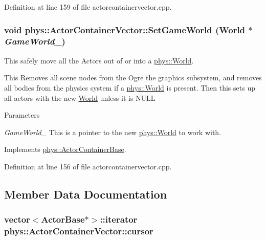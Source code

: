 Definition at line 159 of file actorcontainervector.cpp.

\hypertarget{classphys_1_1ActorContainerVector_ab4c1394254057465f7a2f89b87dc49aa}{
\subsubsection[{SetGameWorld}]{\setlength{\rightskip}{0pt plus 5cm}void phys::ActorContainerVector::SetGameWorld ({\bf World} $\ast$ {\em GameWorld\_\-})}}
\label{d3/d64/classphys_1_1ActorContainerVector_ab4c1394254057465f7a2f89b87dc49aa}


This safely move all the Actors out of or into a \hyperlink{classphys_1_1World}{phys::World}. 

This Removes all scene nodes from the Ogre the graphics subsystem, and removes all bodies from the physics system if a \hyperlink{classphys_1_1World}{phys::World} is present. Then this sets up all actors with the new \hyperlink{classphys_1_1World}{World} unless it is NULL 
\begin{DoxyParams}{Parameters}
\item[{\em GameWorld\_\-}]This is a pointer to the new \hyperlink{classphys_1_1World}{phys::World} to work with. \end{DoxyParams}


Implements \hyperlink{classphys_1_1ActorContainerBase_ae0cb5c288f17507247dd98d3a2466876}{phys::ActorContainerBase}.



Definition at line 156 of file actorcontainervector.cpp.



\subsection{Member Data Documentation}
\hypertarget{classphys_1_1ActorContainerVector_a08bdad9b15e265b5d44470f21766b6ed}{
\subsubsection[{cursor}]{\setlength{\rightskip}{0pt plus 5cm}vector$<${\bf ActorBase}$\ast$$>$::iterator {\bf phys::ActorContainerVector::cursor}}}
\label{d3/d64/classphys_1_1ActorContainerVector_a08bdad9b15e265b5d44470f21766b6ed}


